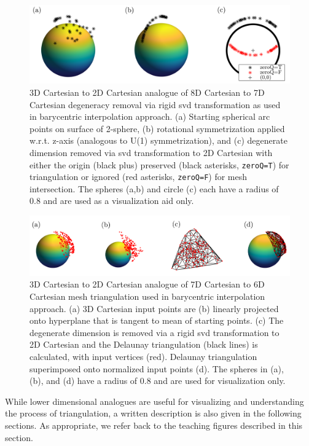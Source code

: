 \documentclass[final,twocolumn,12pt]{elsarticle}
\newcommand{\inpt}{input}
\begin{document}
{\begin{appendices}
\begin{figure}
    \centering
    \includegraphics[scale=1]{bary-remove-deg.png}
    \caption{3D Cartesian to 2D Cartesian analogue of 8D Cartesian to 7D Cartesian degeneracy removal via rigid \gls{svd} transformation as used in barycentric interpolation approach. (a) Starting spherical arc points on surface of 2-sphere, (b) rotational symmetrization applied w.r.t. z-axis (analogous to U(1) symmetrization), and (c) degenerate dimension removed via \acrlong{svd} transformation to 2D Cartesian with either the origin (black plus) preserved (black asterisks, \texttt{zeroQ=T}) for triangulation or ignored (red asterisks, \texttt{zeroQ=F}) for mesh intersection. The spheres (a,b) and circle (c) each have a radius of 0.8 and are used as a visualization aid only.}
    \label{fig:bary-remove-deg}
\end{figure}

\begin{figure}
    \centering
    \includegraphics[scale=1]{bary-delaunay.png}
    \caption{3D Cartesian to 2D Cartesian analogue of 7D Cartesian to 6D Cartesian mesh triangulation used in barycentric interpolation approach. (a) 3D Cartesian \inpt{} points are (b) linearly projected onto hyperplane that is tangent to mean of starting points. (c) The degenerate dimension is removed via a rigid \gls{svd} transformation to 2D Cartesian and the Delaunay triangulation (black lines) is calculated, with \inpt{} vertices (red). Delaunay triangulation superimposed onto normalized \inpt{} points (d). The spheres in (a), (b), and (d) have a radius of 0.8 and are used for visualization only.}
    \label{fig:bary-delaunay}
\end{figure}

While lower dimensional analogues are useful for visualizing and understanding the process of triangulation, a written description is also given in the following sections. As appropriate, we refer back to the teaching figures described in this section.


\end{appendices}}
\end{document}
